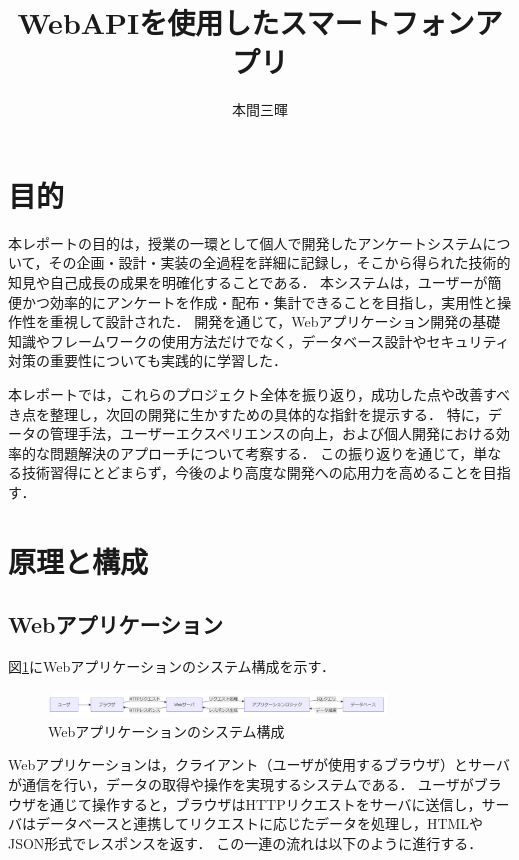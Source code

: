 \documentclass[titlepage,a4paper]{jsarticle}
\title{WebAPIを使用したスマートフォンアプリ}
\author{本間三暉}
\begin{document}
\maketitle

\section{目的}
本レポートの目的は，授業の一環として個人で開発したアンケートシステムについて，その企画・設計・実装の全過程を詳細に記録し，そこから得られた技術的知見や自己成長の成果を明確化することである．
本システムは，ユーザーが簡便かつ効率的にアンケートを作成・配布・集計できることを目指し，実用性と操作性を重視して設計された．
開発を通じて，Webアプリケーション開発の基礎知識やフレームワークの使用方法だけでなく，データベース設計やセキュリティ対策の重要性についても実践的に学習した．

本レポートでは，これらのプロジェクト全体を振り返り，成功した点や改善すべき点を整理し，次回の開発に生かすための具体的な指針を提示する．
特に，データの管理手法，ユーザーエクスペリエンスの向上，および個人開発における効率的な問題解決のアプローチについて考察する．
この振り返りを通じて，単なる技術習得にとどまらず，今後のより高度な開発への応用力を高めることを目指す．
\section{原理と構成}
\subsection{Webアプリケーション}
図\ref{web}にWebアプリケーションのシステム構成を示す．
\begin{figure}[H]
  \centering
  \includegraphics[width=0.8\textwidth]{img/genri/web.png}
  \caption{Webアプリケーションのシステム構成}
  \label{web}
\end{figure}
Webアプリケーションは，クライアント（ユーザが使用するブラウザ）とサーバが通信を行い，データの取得や操作を実現するシステムである．
ユーザがブラウザを通じて操作すると，ブラウザはHTTPリクエストをサーバに送信し，サーバはデータベースと連携してリクエストに応じたデータを処理し，HTMLやJSON形式でレスポンスを返す．
この一連の流れは以下のように進行する．
\end{document}
